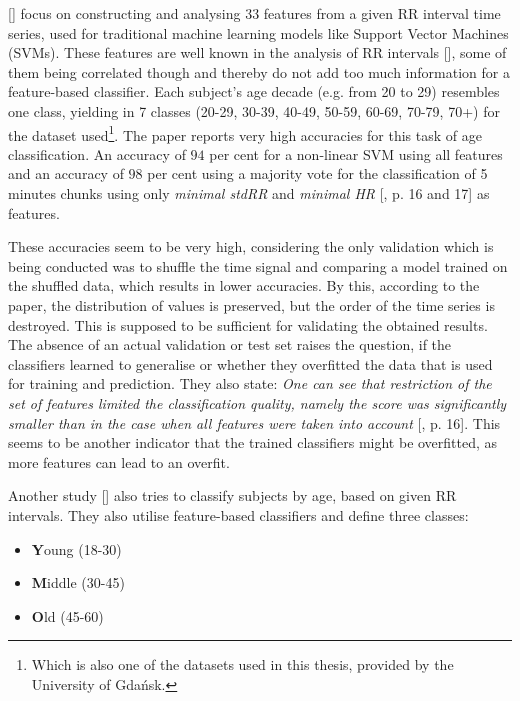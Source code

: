 \documentclass[11pt]{scrartcl}
\begin{document}
[\cite{patternshrd}] focus on constructing and analysing $33$ features from a given RR interval time series, used for traditional machine learning models like Support Vector Machines (SVMs). These features are well known in the analysis of RR intervals [\cite{features_well_known}], some of them being correlated though and thereby do not add too much information for a feature-based classifier. Each subject's age decade (e.g. from 20 to 29) resembles one class, yielding in 7 classes (20-29, 30-39, 40-49, 50-59, 60-69, 70-79, 70+) for the dataset used\footnote{Which is also one of the datasets used in this thesis, provided by the University of Gdańsk.}. The paper reports very high accuracies for this task of age classification. An accuracy of $94$ per cent for a non-linear SVM using all features and an accuracy of $98$ per cent using a majority vote for the classification of 5 minutes chunks using only \textit{minimal stdRR} and \textit{minimal HR} [\cite{patternshrd}, p. 16 and 17] as features.

These accuracies seem to be very high, considering the only validation which is being conducted was to shuffle the time signal and comparing a model trained on the shuffled data, which results in lower accuracies. By this, according to the paper, the distribution of values is preserved, but the order of the time series is destroyed. This is supposed to be sufficient for validating the obtained results. The absence of an actual validation or test set raises the question, if the classifiers learned to generalise or whether they overfitted the data that is used for training and prediction. They also state: \textit{One can see that restriction of the set of features limited the classification quality, namely the score was significantly smaller than in the case when all features were taken into account} [\cite{patternshrd}, p. 16]. This seems to be another indicator that the trained classifiers might be overfitted, as more features can lead to an overfit.

Another study [\cite{threeclassclassification}] also tries to classify subjects by age, based on given RR intervals. They also utilise feature-based classifiers and define three classes:

\begin{itemize}
    \item \textbf{Y}oung (18-30)
    \item \textbf{M}iddle (30-45)
    \item \textbf{O}ld (45-60)
\end{itemize}
\end{document}
